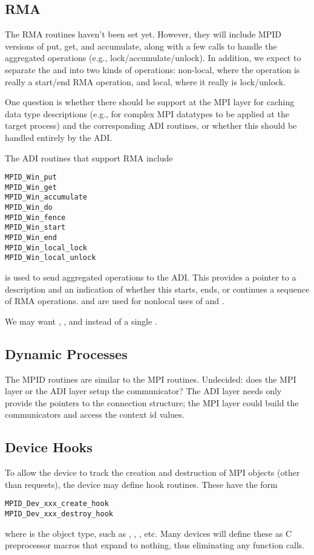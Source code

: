 \subsection{RMA}
The RMA routines haven't been set yet.  However, they will include
MPID versions of put, get, and accumulate, along with a few calls to
handle the aggregated operations (e.g., lock/accumulate/unlock).
In addition, we expect to separate the  and
 into two kinds of operations: non-local, where
the operation is really a start/end RMA operation, and local, where it
really is lock/unlock.

One question is whether there should be support at the MPI layer for
caching data type descriptions (e.g., for complex MPI datatypes to be
applied at the target process) and the corresponding ADI routines, or
whether this should be handled entirely by the ADI.

The ADI routines that support RMA include
\begin{verbatim}
MPID_Win_put
MPID_Win_get
MPID_Win_accumulate
MPID_Win_do
MPID_Win_fence
MPID_Win_start
MPID_Win_end
MPID_Win_local_lock
MPID_Win_local_unlock
\end{verbatim}
 is used to send aggregated operations to the ADI.  This
provides a pointer to a description and an indication of whether this starts,
ends, or continues a sequence of RMA operations.   and
 are used for nonlocal uses of  and .

We may want , , and
 instead of a single .

\subsection{Dynamic Processes}
The MPID routines are similar to the MPI routines.  Undecided: does
the MPI layer or the ADI layer setup the communicator?  The ADI layer
needs only provide the pointers to the connection structure; the MPI
layer could build the communicators and access the context id values.

\subsection{Device Hooks}
To allow the device to track the creation and destruction of MPI
objects (other than requests), the device may define hook routines.
These have the form
\begin{verbatim}
MPID_Dev_xxx_create_hook
MPID_Dev_xxx_destroy_hook
\end{verbatim}
where  is the object type, such as ,
, , etc.  Many devices will define these as
C preprocessor macros that expand to nothing, thus eliminating any
function calls.
